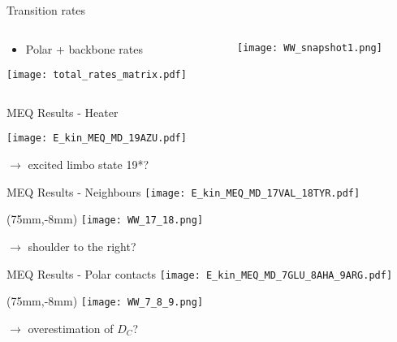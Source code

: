 \begin{frame}[t]{Transition rates}
  \begin{columns}
    \begin{column}{0.5\textwidth}
      \begin{itemize}
        \item Polar + backbone rates 
      \end{itemize}
      \begin{center}
        \texttt{[image: total\_rates\_matrix.pdf]}
      \end{center}
    \end{column}
    \begin{column}{0.5\textwidth}
      \texttt{[image: WW\_snapshot1.png]}  
    \end{column}
  \end{columns}

\end{frame}

\begin{frame}[t]{MEQ Results - Heater}
  \begin{center}
    \texttt{[image: E\_kin\_MEQ\_MD\_19AZU.pdf]}
  \end{center}  
  $\rightarrow$ excited limbo state 19*?
\end{frame}

\begin{frame}[t]{MEQ Results - Neighbours}
  \texttt{[image: E\_kin\_MEQ\_MD\_17VAL\_18TYR.pdf]}
  \begin{textblock*}{0.4\textwidth}(75mm,-8mm)
    \texttt{[image: WW\_17\_18.png]}
  \end{textblock*}
  $\rightarrow$ shoulder to the right?
\end{frame}

\begin{frame}[t]{MEQ Results - Polar contacts}
  \texttt{[image: E\_kin\_MEQ\_MD\_7GLU\_8AHA\_9ARG.pdf]}
  \begin{textblock*}{0.4\textwidth}(75mm,-8mm)
    \texttt{[image: WW\_7\_8\_9.png]}
  \end{textblock*}
  $\rightarrow$ overestimation of $D_C$?
\end{frame}
